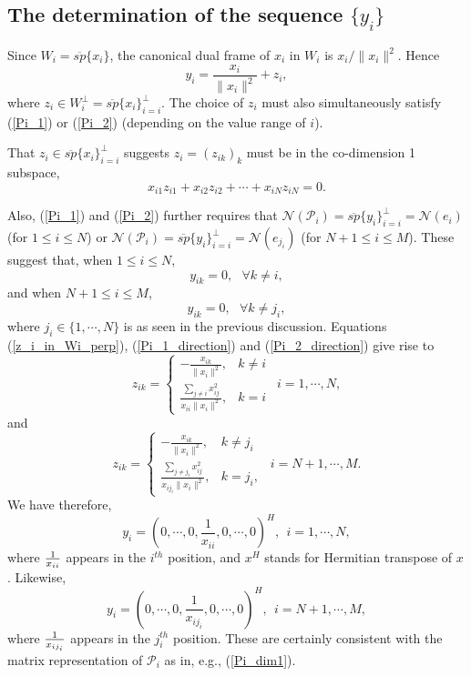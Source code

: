 \documentclass[11pt,reqno]{amsart}
\theoremstyle{remark}
\begin{document}
\subsection*{The determination of the sequence $\{y_i\}$}

Since $W_i={\overline{sp}}\{x_i\}$, the canonical dual frame of $x_i$ in $W_i$ is $x_i/\|x_i\|^2$.  Hence
\[
  y_i =\frac{x_i}{\|x_i\|^2} +z_i,
\]
where $z_i\in W_i^{\perp} ={\overline{sp}}\{x_i\}_{i=i}^{\perp}$.  The choice of $z_i$ must also simultaneously satisfy (\ref{Pi_1}) or (\ref{Pi_2}) (depending on the value range of $i$).

That $z_i\in{\overline{sp}}\{x_i\}_{i=i}^{\perp}$ suggests $z_i=(z_{ik})_k$ must be in the co-dimension 1 subspace,
\begin{equation}\label{z_i_in_Wi_perp}
x_{i1}z_{i1}+x_{i2}z_{i2}+\cdots +x_{iN}z_{iN} =0 .
\end{equation}

Also,
(\ref{Pi_1}) and (\ref{Pi_2}) further requires that ${{\mathcal N}}({{\mathcal P}}_i)={\overline{sp}}\{y_i\}_{i=i}^{\perp} = {{\mathcal N}}(e_i)$
 (for $1\leq i\leq N$) or ${{\mathcal N}}({{\mathcal P}}_i) ={\overline{sp}}\{y_i\}_{i=i}^{\perp} = {{\mathcal N}}(e_{j_i})$ (for $N+1\leq i\leq M$).
 These suggest that, when $1\leq i\leq N$,
\begin{equation} \label{Pi_1_direction}
    y_{ik}=0, {\ \ \ } \forall k\neq i,
\end{equation}
and when $N+1\leq i\leq M$,
\begin{equation} \label{Pi_2_direction}
    y_{ik}=0, {\ \ \ } \forall k\neq j_i,
\end{equation}
where $j_i\in \{1,\cdots,N\}$ is as seen in the previous discussion.
Equations (\ref{z_i_in_Wi_perp}), (\ref{Pi_1_direction}) and (\ref{Pi_2_direction}) give rise to
\[
z_{ik}=\left\{\begin{array}{ll}
 -\frac{x_{ik}}{\|x_i\|^2}, & k\neq i \\
  \frac{\sum_{j\neq i}x_{ij}^2}{x_{ii}\|x_i\|^2}, & k=i\end{array}\right. \ \ i=1, \cdots, N,
\]
and
\[
z_{ik}=\left\{\begin{array}{ll}
 -\frac{x_{ik}}{\|x_i\|^2}, & k\neq j_i \\
  \frac{\sum_{j\neq j_i}x_{ij}^2}{x_{ij_i}\|x_i\|^2}, & k=j_i,\end{array}\right. \ \ i=N+1,\cdots , M.
\]
We have therefore,
\[
y_i =\left(0,\cdots,0,\frac{1}{x_{ii}},0,\cdots,0  \right)^H, \ \ i=1, \cdots, N,
\]
where ${\displaystyle} \frac{1}{x_{ii}}$ appears in the $i^{th}$ position, and $x^H$ stands for Hermitian transpose of $x$.  Likewise,
\[
y_i =\left(0,\cdots,0,\frac{1}{x_{ij_i}},0,\cdots,0  \right)^H, \ \ i=N+1, \cdots, M,
\]
where ${\displaystyle} \frac{1}{x_{ij_i}}$ appears in the $j_i^{th}$ position.  These are certainly consistent with the matrix representation of ${{\mathcal P}}_i$ as in, e.g., (\ref{Pi_dim1}).
\end{document}
